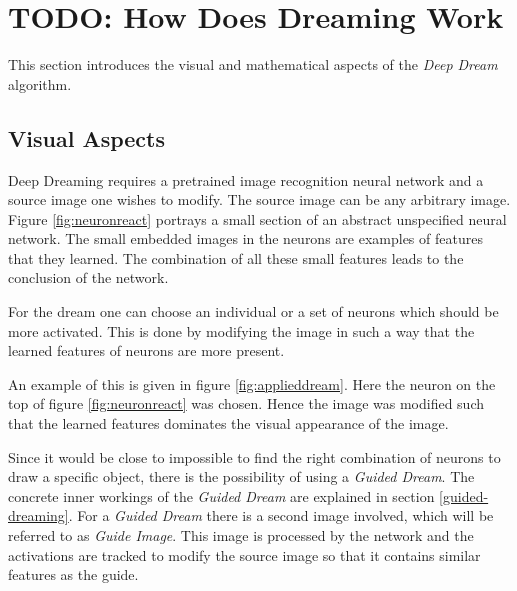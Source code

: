 

\section{TODO: How Does Dreaming Work}
\label{sec:how}

This section introduces the visual and mathematical aspects of the \emph{Deep Dream} algorithm.

\subsection{Visual Aspects}
\label{sec:visual-aspects}
Deep Dreaming requires a pretrained image recognition neural network and a source image one wishes to modify.
The source image can be any arbitrary image.
Figure \ref{fig:neuronreact} portrays a small section of an abstract unspecified neural network.
The small embedded images in the neurons are examples of features that they learned.
The combination of all these small features leads to the conclusion of the network.

For the dream one can choose an individual or a set of neurons which should be more activated.
This is done by modifying the image in such a way that the learned features of  neurons are more present.

An example of this is given in figure \ref{fig:applieddream}.
Here the neuron on the top of figure \ref{fig:neuronreact} was chosen.
Hence the image was modified such that the learned features dominates the visual appearance of the image.

Since it would be close to impossible to find the right combination of neurons to draw a specific object, there is the possibility of using a \textit{Guided Dream}.
The concrete inner workings of the \textit{Guided Dream} are explained in section \ref{guided-dreaming}.
For a \textit{Guided Dream} there is a second image involved, which will be referred to as \textit{Guide Image}.
This image is processed by the network and the activations are tracked to modify the source image so that it contains similar features as the guide.

